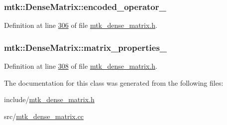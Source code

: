 \hypertarget{classmtk_1_1DenseMatrix_ad1633ffc35da862b5284d3907ab5175a}{
\subsubsection[{encoded\+\_\+operator\+\_\+}]{ mtk\+::\+Dense\+Matrix\+::encoded\+\_\+operator\+\_\+\hspace{0.3cm}{\ttfamily [private]}}}\label{classmtk_1_1DenseMatrix_ad1633ffc35da862b5284d3907ab5175a}


Definition at line \hyperlink{mtk__dense__matrix_8h_source_l00306}{306} of file \hyperlink{mtk__dense__matrix_8h_source}{mtk\+\_\+dense\+\_\+matrix.\+h}.

\hypertarget{classmtk_1_1DenseMatrix_a481c8d09af685a5ba67acefdcaa810cc}{
\subsubsection[{matrix\+\_\+properties\+\_\+}]{ mtk\+::\+Dense\+Matrix\+::matrix\+\_\+properties\+\_\+\hspace{0.3cm}{\ttfamily [private]}}}\label{classmtk_1_1DenseMatrix_a481c8d09af685a5ba67acefdcaa810cc}


Definition at line \hyperlink{mtk__dense__matrix_8h_source_l00308}{308} of file \hyperlink{mtk__dense__matrix_8h_source}{mtk\+\_\+dense\+\_\+matrix.\+h}.



The documentation for this class was generated from the following files\+:\begin{DoxyCompactItemize}
\item 
include/\hyperlink{mtk__dense__matrix_8h}{mtk\+\_\+dense\+\_\+matrix.\+h}\item 
src/\hyperlink{mtk__dense__matrix_8cc}{mtk\+\_\+dense\+\_\+matrix.\+cc}\end{DoxyCompactItemize}
